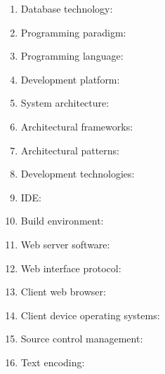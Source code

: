  
%

	\begin{enumerate}
		\item Database technology: 
		\item Programming paradigm: 
		\item Programming language: 
		\item Development platform:  
		\item System architecture: 
		\item Architectural frameworks: 
		\item Architectural patterns: 
		\item Development technologies:
		\item IDE:
		\item Build environment:
		\item Web server software:
		\item Web interface protocol:
		\item Client web browser:
		\item Client device operating systems:
		\item Source control management: 
		\item Text encoding: 
	\end{enumerate}

%
